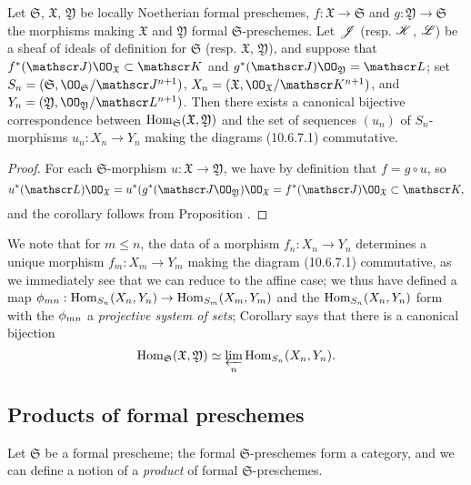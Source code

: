 \begin{cor}[10.6.11]
\label{1.10.6.11}
Let $\mathfrak{S}$, $\mathfrak{X}$, $\mathfrak{Y}$ be locally Noetherian formal preschemes, $f:\mathfrak{X}\to\mathfrak{S}$ and $g:\mathfrak{Y}\to\mathfrak{S}$ the morphisms making $\mathfrak{X}$ and $\mathfrak{Y}$ formal $\mathfrak{S}$-preschemes.
Let $\mathscr{J}$ (resp. $\mathscr{K}$, $\mathscr{L}$) be a sheaf of ideals of definition for $\mathfrak{S}$ (resp. $\mathfrak{X}$, $\mathfrak{Y}$), and suppose that $f^*(\sh{J})\OO_\mathfrak{X}\subset\sh{K}$ and $g^*(\sh{J})\OO_\mathfrak{Y}=\sh{L}$; set $S_n=(\mathfrak{S},\OO_\mathfrak{S}/\sh{J}^{n+1})$, $X_n=(\mathfrak{X},\OO_\mathfrak{X}/\sh{K}^{n+1})$, and $Y_n=(\mathfrak{Y},\OO_\mathfrak{Y}/\sh{L}^{n+1})$.
Then there exists a canonical bijective correspondence
between $\operatorname{Hom}_\mathfrak{S}(\mathfrak{X},\mathfrak{Y})$ and the set of sequences $(u_n)$ of $S_n$-morphisms $u_n:X_n\to Y_n$ making the diagrams (10.6.7.1) commutative.
\end{cor}

\begin{proof}
\label{proof-1.10.6.11}
For each $\mathfrak{S}$-morphism $u:\mathfrak{X}\to\mathfrak{Y}$, we have by definition that $f=g\circ u$, so
\[
  u^*(\sh{L})\OO_\mathfrak{X}=u^*(g^*(\sh{J}\OO_\mathfrak{Y})\OO_\mathfrak{X}=f^*(\sh{J})\OO_\mathfrak{X}\subset\sh{K},
\]
and the corollary follows from Proposition .
\end{proof}

We note that for $m\leq n$, the data of a morphism $f_n:X_n\to Y_n$ determines a unique morphism $f_m:X_m\to Y_m$ making the diagram (10.6.7.1) commutative, as we immediately see that we can reduce to the affine case; we thus have defined a map $\vphi_{mn}:\Hom_{S_n}(X_n,Y_n)\to\Hom_{S_m}(X_m,Y_m)$ and the $\operatorname{Hom}_{S_n}(X_n,Y_n)$ form with the $\phi_{mn}$ a \emph{projective system of sets}; Corollary  says that there is a canonical bijection
\[
  \operatorname{Hom}_\mathfrak{S}(\mathfrak{X},\mathfrak{Y})\simeq\varprojlim_n\operatorname{Hom}_{S_n}(X_n,Y_n).
\]

\subsection{Products of formal preschemes}
\label{subsection:1.10.7}

\begin{env}[10.7.1]
\label{1.10.7.1}
Let $\mathfrak{S}$ be a formal prescheme; the formal $\mathfrak{S}$-preschemes form a category, and we can define a notion of a \emph{product} of formal $\mathfrak{S}$-preschemes.
\end{env}

